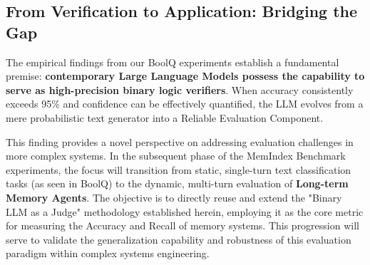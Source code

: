 \subsection{From Verification to Application: Bridging the Gap}

The empirical findings from our BoolQ experiments establish a fundamental premise: \textbf{contemporary Large Language Models possess the capability to serve as high-precision binary logic verifiers}. When accuracy consistently exceeds 95\% and confidence can be effectively quantified, the LLM evolves from a mere probabilistic text generator into a Reliable Evaluation Component.

This finding provides a novel perspective on addressing evaluation challenges in more complex systems. In the subsequent phase of the MemIndex Benchmark experiments, the focus will transition from static, single-turn text classification tasks (as seen in BoolQ) to the dynamic, multi-turn evaluation of \textbf{Long-term Memory Agents}. The objective is to directly reuse and extend the "Binary LLM as a Judge" methodology established herein, employing it as the core metric for measuring the Accuracy and Recall of memory systems. This progression will serve to validate the generalization capability and robustness of this evaluation paradigm within complex systems engineering.
